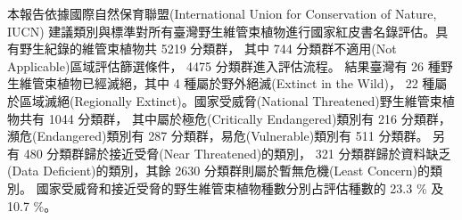 \noindent 本報告依據國際自然保育聯盟(International Union for Conservation of Nature, IUCN)
建議類別與標準對所有臺灣野生維管束植物進行國家紅皮書名錄評估。具有野生紀錄的維管束植物共 5219 分類群，
其中 744 分類群不適用(Not Applicable)區域評估篩選條件， 4475 分類群進入評估流程。
結果臺灣有 26 種野生維管束植物已經滅絕，其中 4 種屬於野外絕滅(Extinct in the Wild)，
22 種屬於區域滅絕(Regionally Extinct)。國家受威脅(National Threatened)野生維管束植物共有 1044 分類群，
其中屬於極危(Critically Endangered)類別有 216 分類群，
瀕危(Endangered)類別有 287 分類群，易危(Vulnerable)類別有 511 分類群。
另有 480 分類群歸於接近受脅(Near Threatened)的類別，
321 分類群歸於資料缺乏(Data Deficient)的類別，其餘 2630 分類群則屬於暫無危機(Least Concern)的類別。
國家受威脅和接近受脅的野生維管束植物種數分別占評估種數的 23.3 \% 及 10.7 \%。 
